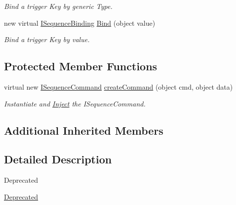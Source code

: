\begin{DoxyCompactItemize}
\begin{DoxyCompactList}\small\item\em Bind a trigger Key by generic Type. \end{DoxyCompactList}\item 
\hypertarget{classstrange_1_1extensions_1_1sequencer_1_1impl_1_1_sequencer_a600c15d53b462688c4898f47e5b48ad2}{new virtual \hyperlink{interfacestrange_1_1extensions_1_1sequencer_1_1api_1_1_i_sequence_binding}{I\-Sequence\-Binding} \hyperlink{classstrange_1_1extensions_1_1sequencer_1_1impl_1_1_sequencer_a600c15d53b462688c4898f47e5b48ad2}{Bind} (object value)}\label{classstrange_1_1extensions_1_1sequencer_1_1impl_1_1_sequencer_a600c15d53b462688c4898f47e5b48ad2}

\begin{DoxyCompactList}\small\item\em Bind a trigger Key by value. \end{DoxyCompactList}\end{DoxyCompactItemize}
\subsection*{Protected Member Functions}
\begin{DoxyCompactItemize}
\item 
\hypertarget{classstrange_1_1extensions_1_1sequencer_1_1impl_1_1_sequencer_a6e1c819a7c2fe3fa12a40452ee622492}{virtual new \hyperlink{interfacestrange_1_1extensions_1_1sequencer_1_1api_1_1_i_sequence_command}{I\-Sequence\-Command} \hyperlink{classstrange_1_1extensions_1_1sequencer_1_1impl_1_1_sequencer_a6e1c819a7c2fe3fa12a40452ee622492}{create\-Command} (object cmd, object data)}\label{classstrange_1_1extensions_1_1sequencer_1_1impl_1_1_sequencer_a6e1c819a7c2fe3fa12a40452ee622492}

\begin{DoxyCompactList}\small\item\em Instantiate and \hyperlink{class_inject}{Inject} the I\-Sequence\-Command. \end{DoxyCompactList}\end{DoxyCompactItemize}
\subsection*{Additional Inherited Members}


\subsection{Detailed Description}
\begin{DoxyRefDesc}{Deprecated}
\item[\hyperlink{deprecated__deprecated000008}{Deprecated}]\end{DoxyRefDesc}


